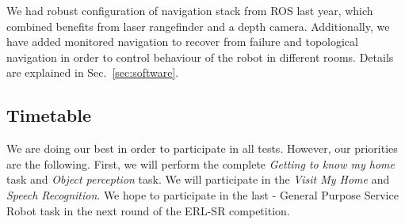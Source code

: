 
We had robust configuration of navigation stack from ROS last year, which combined benefits from laser rangefinder and a depth camera. 
Additionally, we have added monitored navigation to recover from failure and topological navigation in order to control behaviour of the robot in different rooms. Details are explained in Sec.~\ref{sec:software}.




\subsection{Timetable}

We are doing our best in order to participate in all tests. However, our priorities are the following.
First, we will perform the complete \textit{Getting to know my home} task and \textit{Object perception} task.
We will participate in the \textit{Visit My Home} and \textit{Speech Recognition}. We hope to participate in the last - General Purpose Service Robot task in the next round of the ERL-SR competition.


